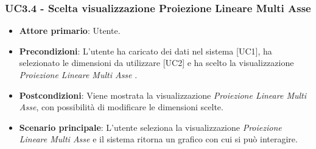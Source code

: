 \subsubsection{UC3.4 - Scelta visualizzazione Proiezione Lineare Multi Asse}

\begin{itemize}
	\item \textbf{Attore primario}: Utente.
	\item \textbf{Precondizioni}: L'utente ha caricato dei dati nel sistema [UC1], ha selezionato le dimensioni da utilizzare [UC2] e ha scelto la visualizzazione \textit{Proiezione Lineare Multi Asse} .
	\item \textbf{Postcondizioni}: Viene mostrata la visualizzazione \textit{Proiezione Lineare Multi Asse}, con possibilità di modificare le dimensioni scelte.
	\item \textbf{Scenario principale}: L'utente seleziona la visualizzazione \textit{Proiezione Lineare Multi Asse} e il sistema ritorna un grafico con cui si può interagire.
\end{itemize}